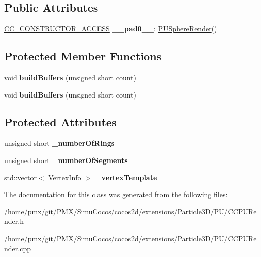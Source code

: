 \subsection*{Public Attributes}
\begin{DoxyCompactItemize}
\item 
\mbox{\label{classPUSphereRender_aca679d79d4a576e4c56de3b1752d7e85}} 
\hyperlink{_2cocos2d_2cocos_2base_2ccConfig_8h_a25ef1314f97c35a2ed3d029b0ead6da0}{C\+C\+\_\+\+C\+O\+N\+S\+T\+R\+U\+C\+T\+O\+R\+\_\+\+A\+C\+C\+E\+SS} {\bfseries \+\_\+\+\_\+pad0\+\_\+\+\_\+}\+: \hyperlink{classPUSphereRender}{P\+U\+Sphere\+Render}()
\end{DoxyCompactItemize}
\subsection*{Protected Member Functions}
\begin{DoxyCompactItemize}
\item 
\mbox{\label{classPUSphereRender_a29a0e59cc9c96bf497e8e4bde2ef68da}} 
void {\bfseries build\+Buffers} (unsigned short count)
\item 
\mbox{\label{classPUSphereRender_a29a0e59cc9c96bf497e8e4bde2ef68da}} 
void {\bfseries build\+Buffers} (unsigned short count)
\end{DoxyCompactItemize}
\subsection*{Protected Attributes}
\begin{DoxyCompactItemize}
\item 
\mbox{\label{classPUSphereRender_a5aebf2e50a6dd8a39572142ee8acc0b9}} 
unsigned short {\bfseries \+\_\+number\+Of\+Rings}
\item 
\mbox{\label{classPUSphereRender_a92d568a1d2ced5ce0730a15f20b6ac7d}} 
unsigned short {\bfseries \+\_\+number\+Of\+Segments}
\item 
\mbox{\label{classPUSphereRender_a2e72ca1ceb17b91f94c5a630e8c23c36}} 
std\+::vector$<$ \hyperlink{structPUParticle3DEntityRender_1_1VertexInfo}{Vertex\+Info} $>$ {\bfseries \+\_\+vertex\+Template}
\end{DoxyCompactItemize}


The documentation for this class was generated from the following files\+:\begin{DoxyCompactItemize}
\item 
/home/pmx/git/\+P\+M\+X/\+Simu\+Cocos/cocos2d/extensions/\+Particle3\+D/\+P\+U/C\+C\+P\+U\+Render.\+h\item 
/home/pmx/git/\+P\+M\+X/\+Simu\+Cocos/cocos2d/extensions/\+Particle3\+D/\+P\+U/C\+C\+P\+U\+Render.\+cpp\end{DoxyCompactItemize}
